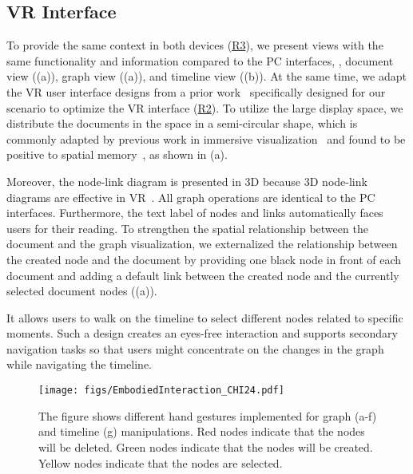 \subsection{VR Interface}
To provide the same context in both devices (\hyperref[req:r3]{R3}), we present views with the same functionality and information compared to the PC interfaces, \ie{}, document view ((a)), graph view ((a)), and timeline view ((b)).
At the same time, we adapt the VR user interface designs from a prior work~\cite{tong2023towards} specifically designed for our scenario to optimize the VR interface (\hyperref[req:r2]{R2}).
To utilize the large display space, we distribute the documents in the space in a semi-circular shape, which is commonly adapted by previous work in immersive visualization~\cite{satriadi2020maps,hayatpur2020datahop} and found to be positive to spatial memory~\cite{liu2022effects}, as shown in (a).

Moreover, the node-link diagram is presented in 3D because 3D node-link diagrams are effective in VR~\cite{belcher2003using,kwon2016study,ware2005reevaluating}.
All graph operations are identical to the PC interfaces.
Furthermore, the text label of nodes and links automatically faces users for their reading. 
To strengthen the spatial relationship between the document and the graph visualization, we externalized the relationship between the created node and the document by providing one black node in front of each document and adding a default link between the created node and the currently selected document nodes ((a)).

 It allows users to walk on the timeline to select different nodes related to specific moments. Such a design creates an eyes-free interaction and supports secondary navigation tasks so that users might concentrate on the changes in the graph while navigating the timeline.

\begin{figure}
\centering
\texttt{[image: figs/EmbodiedInteraction\_CHI24.pdf]}
\caption{The figure shows different hand gestures implemented for graph (a-f) and timeline (g) manipulations. Red nodes indicate that the nodes will be deleted. Green nodes indicate that the nodes will be created. Yellow nodes indicate that the nodes are selected.}
\label{fig:embodied}
\end{figure}

